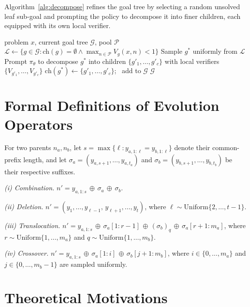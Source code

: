 Algorithm~\ref{alg:decompose} refines the goal tree by selecting a random unsolved leaf sub-goal and prompting the policy to decompose it into finer children, each equipped with its own local verifier.

\begin{algorithm}[h]
\caption{\textsc{BackwardDecompose}: Goal Tree Decomposition}
\label{alg:decompose}
\begin{algorithmic}[1]
\Require problem $x$, current goal tree $\mathcal{G}$, pool $\mathcal{P}$
\State $\mathcal{L} \leftarrow \{g \in \mathcal{G} : \mathrm{ch}(g) = \emptyset \wedge \max_{n \in \mathcal{P}} V_g(x, n) < 1\}$ 
\State Sample $g^*$ uniformly from $\mathcal{L}$
\State Prompt $\pi_\theta$ to decompose $g^*$ into children $\{g'_1, \ldots, g'_c\}$ with local verifiers $\{V_{g'_1}, \ldots, V_{g'_c}\}$
\State $\mathrm{ch}(g^*) \leftarrow \{g'_1, \ldots, g'_c\}$; \, add to $\mathcal{G}$
\State \Return $\mathcal{G}$
\end{algorithmic}
\end{algorithm}

\section{Formal Definitions of Evolution Operators}
\label{app:operators}

For two parents $n_a, n_b$, let $s=\max\{\ell:y_{a,1:\ell}=y_{b,1:\ell}\}$ denote their common-prefix length, and let $\sigma_a=(y_{a,s+1},\dots,y_{a,t_a})$ and $\sigma_b=(y_{b,s+1},\dots,y_{b,t_b})$ be their respective suffixes.

\textit{(i) Combination.} $n' = y_{a,1:s}\,\oplus\,\sigma_a\,\oplus\,\sigma_b$.

\textit{(ii) Deletion.} $n' = (y_{1},\dots,y_{\ell-1},\,y_{\ell+1},\dots,y_{t})$, where $\ell\sim\mathrm{Uniform}\{2,\dots,t-1\}$.

\textit{(iii) Translocation.} $n' = y_{a,1:s}\,\oplus\,\sigma_a[1:r-1]\,\oplus\,(\sigma_b)_q\,\oplus\,\sigma_a[r+1:m_a]$, where $r\sim\mathrm{Uniform}\{1,\dots,m_a\}$ and $q\sim\mathrm{Uniform}\{1,\dots,m_b\}$.

\textit{(iv) Crossover.} $n' = y_{a,1:s}\,\oplus\,\sigma_a[1:i]\,\oplus\,\sigma_b[j+1:m_b]$, where $i\in\{0,\dots,m_a\}$ and $j\in\{0,\dots,m_b-1\}$ are sampled uniformly.

\section{Theoretical Motivations}
\label{app:theory}


